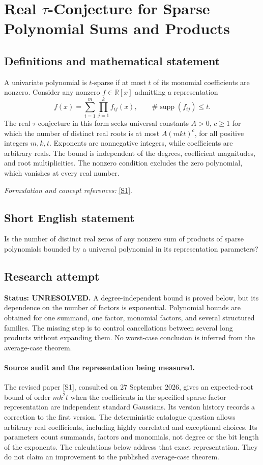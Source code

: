 \documentclass[11pt]{article}
\begin{document}
\section*{\texorpdfstring{Real $\tau$-Conjecture for Sparse Polynomial Sums and Products}{Real \$\textbackslash{}tau\$-Conjecture for Sparse Polynomial Sums and Products}}\label{30002235}
\subsection{Definitions and mathematical statement}
A univariate polynomial is $t$-sparse if at most $t$ of its monomial coefficients are nonzero. Consider any nonzero $f\in{\mathbb{R}}[x]$ admitting a representation
\[
 f(x)=\sum_{i=1}^{m}\prod_{j=1}^{k}f_{ij}(x),
 \qquad \#\operatorname{supp}(f_{ij})\le t.
\]
The real $\tau$-conjecture in this form seeks universal constants $A>0$, $c\ge1$ for which the number of distinct real roots is at most $A(mkt)^c$, for all positive integers $m,k,t$. Exponents are nonnegative integers, while coefficients are arbitrary reals. The bound is independent of the degrees, coefficient magnitudes, and root multiplicities. The nonzero condition excludes the zero polynomial, which vanishes at every real number.
\par\smallskip\textit{Formulation and concept references:} \href{https://arxiv.org/pdf/1806.00417}{[S1]}.

\subsection{Short English statement}
Is the number of distinct real zeros of any nonzero sum of products of sparse polynomials bounded by a universal polynomial in its representation parameters?
\subsection{Research attempt}
\textbf{Status: UNRESOLVED.} A degree-independent bound is proved below, but its dependence on the number of factors is exponential. Polynomial bounds are obtained for one summand, one factor, monomial factors, and several structured families. The missing step is to control cancellations between several long products without expanding them. No worst-case conclusion is inferred from the average-case theorem.

\paragraph{Source audit and the representation being measured.}
The revised paper [S1], consulted on 27 September 2026, gives an expected-root bound of order $mk^2t$ when the coefficients in the specified sparse-factor representation are independent standard Gaussians. Its version history records a correction to the first version. The deterministic catalogue question allows arbitrary real coefficients, including highly correlated and exceptional choices. Its parameters count summands, factors and monomials, not degree or the bit length of the exponents. The calculations below address that exact representation. They do not claim an improvement to the published average-case theorem.
\end{document}
